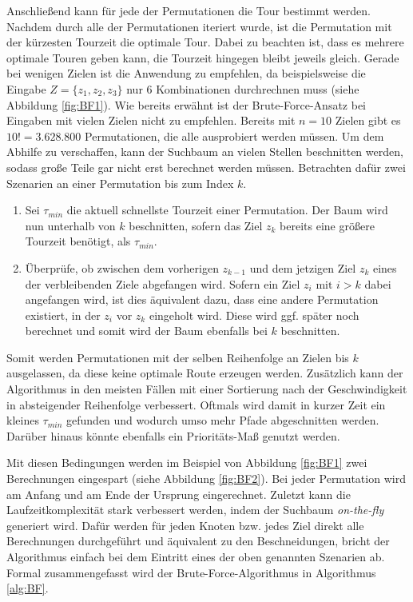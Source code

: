 \documentclass[german,version-2019-11]{uzl-thesis}
\begin{document}
Anschließend kann für jede der Permutationen die Tour bestimmt werden. Nachdem durch alle der Permutationen iteriert wurde, ist die Permutation mit der kürzesten Tourzeit die optimale Tour. Dabei zu beachten ist, dass es mehrere optimale Touren geben kann, die Tourzeit hingegen bleibt jeweils gleich. Gerade bei wenigen Zielen ist die Anwendung zu empfehlen, da beispielsweise die Eingabe $Z=\{z_1, z_2, z_3\}$ nur 6 Kombinationen durchrechnen muss (siehe Abbildung \ref{fig:BF1}). Wie bereits erwähnt ist der Brute-Force-Ansatz bei Eingaben mit vielen Zielen nicht zu empfehlen. Bereits mit $n=10$ Zielen gibt es $10! = 3.628.800$ Permutationen, die alle ausprobiert werden müssen. Um dem Abhilfe zu verschaffen, kann der Suchbaum an vielen Stellen beschnitten werden, sodass große Teile gar nicht erst berechnet werden müssen. Betrachten dafür zwei Szenarien an einer Permutation bis zum Index $k$.
\begin{enumerate}
\item
Sei $\tau_{min}$ die aktuell schnellste Tourzeit einer Permutation. Der Baum wird nun unterhalb von $k$ beschnitten, sofern das Ziel $z_k$ bereits eine größere Tourzeit benötigt, als $\tau_{min}$. 

\item
Überprüfe, ob zwischen dem vorherigen $z_{k-1}$ und dem jetzigen Ziel $z_{k}$ eines der verbleibenden Ziele abgefangen wird. Sofern ein Ziel $z_{i} \text{ mit } i>k$ dabei angefangen wird, ist dies äquivalent dazu, dass eine andere Permutation existiert, in der $z_i$ vor $z_k$ eingeholt wird. Diese wird ggf. später noch berechnet und somit wird der Baum ebenfalls bei $k$ beschnitten.
\end{enumerate} 
Somit werden Permutationen mit der selben Reihenfolge an Zielen bis $k$ ausgelassen, da diese keine optimale Route erzeugen werden. Zusätzlich kann der Algorithmus in den meisten Fällen mit einer Sortierung nach der Geschwindigkeit in absteigender Reihenfolge verbessert. Oftmals wird damit in kurzer Zeit ein kleines $\tau_{min}$ gefunden und wodurch umso mehr Pfade abgeschnitten werden. Darüber hinaus könnte ebenfalls ein Prioritäts-Maß genutzt werden. 

Mit diesen Bedingungen werden im Beispiel von Abbildung \ref{fig:BF1} zwei Berechnungen eingespart (siehe Abbildung \ref{fig:BF2}). Bei jeder Permutation wird am Anfang und am Ende der Ursprung eingerechnet. Zuletzt kann die Laufzeitkomplexität stark verbessert werden, indem der Suchbaum \emph{on-the-fly} generiert wird. Dafür werden für jeden Knoten bzw. jedes Ziel direkt alle Berechnungen durchgeführt und äquivalent zu den Beschneidungen, bricht der Algorithmus einfach bei dem Eintritt eines der oben genannten Szenarien ab. Formal zusammengefasst wird der Brute-Force-Algorithmus in Algorithmus \ref{alg:BF}. \\
\end{document}

